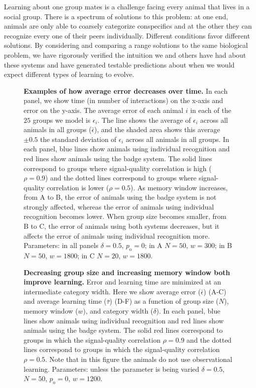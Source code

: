 Learning about one group mates is a challenge facing every animal that lives in a social group. There is a spectrum of solutions to this problem: at one end, animals are only able to coarsely categorize conspecifics and at the other they can recognize every one of their peers individually. Different conditions favor different solutions. By considering and comparing a range solutions to the same biological problem, we have rigorously verified the intuition we and others have had about these systems and have generated testable predictions about when we would expect different types of learning to evolve. 
  

\newpage



\newpage
\begin{figure}
\caption{\label{learning_curves} \sffamily\small\textbf{Examples of how average error decreases over time.}
In each panel, we show time (in number of interactions) on the x-axis and error on the y-axis. The average error of each animal $i$ in each of the $25$ groups we model is $\epsilon_i$. The line shows the average of $\epsilon_i$ across all animals in all groups ($\bar{\epsilon}$), and the shaded area shows this average $\pm 0.5$ the standard deviation of $\epsilon_i$ across all animals in all groups. In each panel, blue lines show animals using individual recognition and red lines show animals using the badge system. The solid lines correspond to groups where signal-quality correlation is high ($\rho=0.9$) and the dotted lines correspond to groups where signal-quality correlation is lower ($\rho=0.5$). As memory window increases, from A to B, the error of animals using the badge system is not strongly affected, whereas the error of animals using individual recognition becomes lower. When group size becomes smaller, from B to C, the error of animals using both systems decreases, but it affects the error of animals using individual recognition more.  Parameters: in all panels $\delta = 0.5$, $p_\text{o}=0$; in A $N=50$, $w=300$; in B $N=50$, $w=1800$; in C $N=20$, $w=1800$. }
\end{figure}

\begin{figure}
\caption{\sffamily\small\textbf{Decreasing group size and increasing memory window both improve learning.} Error and learning time are minimized at an intermediate category width. Here we show average error ($\bar{\epsilon}$) (A-C) and average learning time ($\bar{\tau}$) (D-F) as a function of group size ($N$), memory window ($w$), and category width ($\delta$). In each panel, blue lines show animals using individual recognition and red lines show animals using the badge system. The solid red lines correspond to groups in which the signal-quality correlation $\rho=0.9$ and the dotted lines correspond to groups in which the signal-quality correlation $\rho=0.5$. Note that in this figure the animals do not use observational learning. Parameters: unless the parameter is being varied $\delta = 0.5$, $N=50$, $p_\text{o}=0$, $w=1200$.}
\label{parameters}
\end{figure}


